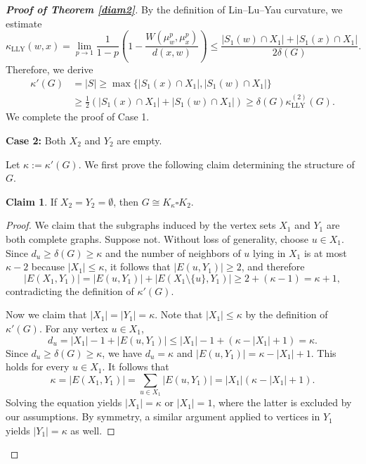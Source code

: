 \documentclass[10pt,a4paper]{article}
\theoremstyle{definition}
\newtheorem{Claim}{Claim}
\theoremstyle{definition}
\theoremstyle{nonumber}
\begin{document}
\begin{proof}[\bf{Proof of Theorem \ref{diam2}}]
By the definition of Lin--Lu--Yau curvature, we estimate
$$
\kappa_{\mathrm{LLY}}(w, x) = \lim_{p \to 1} \frac{1}{1-p} \left( 1 - \frac{W(\mu_w^p, \mu_x^p)}{d(x, w)} \right) \leq \frac{|S_1(w) \cap X_1| + |S_1(x) \cap X_1|}{2\delta(G)}.
$$
Therefore, we derive
\begin{align*}
\kappa'(G) &= |S| \geq \max\{|S_1(x) \cap X_1|, |S_1(w) \cap X_1|\}\\
&\geq \frac{1}{2} (|S_1(x) \cap X_1| + |S_1(w) \cap X_1|) \geq \delta(G) \kappa_{\mathrm{LLY}}^{(2)}(G).
\end{align*}
We complete the proof of Case 1.

\textbf{Case 2:} Both $X_2$ and $Y_2$ are empty.

Let $\kappa:=\kappa'(G)$. We first prove the following claim determining the structure of $G$.
\begin{Claim}\label{claim1}
If $X_2=Y_2= \emptyset$, then $G\cong K_{\kappa}\square K_2$.
\end{Claim}

\begin{proof}
We claim that the subgraphs induced by the vertex sets $X_1$ and $Y_1$ are both complete graphs.
Suppose not. Without loss of generality, choose $u \in X_1$. Since $d_u\geq\delta(G) \geq \kappa$ and the number of neighbors of $u$ lying in $X_1$ is at most $\kappa-2$ because $|X_1|\leq \kappa$, it follows that $|E(u,Y_1)|\geq2$, and therefore 
$$|E(X_1,Y_1)|=|E(u,Y_1)|+|E(X_1\setminus \{u\},Y_1)|\geq2+(\kappa-1)=\kappa+1,$$
contradicting the definition of $\kappa'(G)$.

Now we claim that $|X_1|=|Y_1|=\kappa$.
Note that $|X_1|\leq \kappa$ by the definition of $\kappa'(G)$. For any vertex $u \in X_1$,
$$
d_u=|X_1|-1+|E(u,Y_1)|\leq |X_1|-1+(\kappa-|X_1|+1)=\kappa.
$$
Since $d_u\geq \delta(G)\geq \kappa$, we have $d_u=\kappa$ and $|E(u,Y_1)|=\kappa-|X_1|+1$. This holds for every $u \in X_1$. It follows that
$$
\kappa=|E(X_1,Y_1)|=\sum_{u\in X_1}|E(u,Y_1)|=|X_1|(\kappa-|X_1|+1).
$$
Solving the equation yields $|X_1|=\kappa$ or $|X_1|=1$, where the latter is excluded by our assumptions. By symmetry, a similar argument applied to vertices in $Y_1$ yields $|Y_1|=\kappa$ as well.


\end{proof}
\end{proof}
\end{document}
